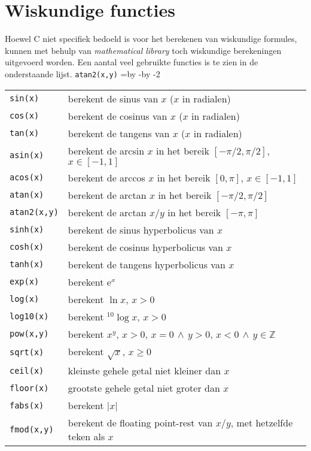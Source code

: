\section{Wiskundige functies}
Hoewel C niet specifiek bedoeld is voor het berekenen van wiskundige formules, kunnen met behulp van \textsl{mathematical library} toch wiskundige berekeningen uitgevoerd worden. Een aantal veel gebruikte functies is te zien in de onderstaande lijst.
\hbox{\texttt{atan2(x,y)}}
\newdimen\delengteb\delengteb=\textwidth\advance\delengteb by -\advance\delengteb by -2\tabcolsep
\begin{table}[!ht]
\centering
\begin{tabular}{lp{\delengteb}}
\texttt{sin(x)} & berekent de sinus van $x$ ($x$ in radialen)\\
\texttt{cos(x)} & berekent de cosinus van $x$ ($x$ in radialen)\\
\texttt{tan(x)} & berekent de tangens van $x$ ($x$ in radialen)\\
\texttt{asin(x)} & berekent de arcsin $x$ in het bereik $[-\pi/2, \pi/2]$,  $x\in [-1,1]$\\
\texttt{acos(x)} & berekent de arccos $x$ in het bereik $[0, \pi]$,  $x\in [-1,1]$\\
\texttt{atan(x)} & berekent de arctan $x$ in het bereik $[-\pi/2, \pi/2]$\\
\texttt{atan2(x,y)} & berekent de arctan $x/y$ in het bereik $[-\pi, \pi]$\\
\texttt{sinh(x)} & berekent de sinus hyperbolicus van $x$\\
\texttt{cosh(x)} & berekent de cosinus hyperbolicus van $x$\\
\texttt{tanh(x)} & berekent de tangens hyperbolicus van $x$\\
\texttt{exp(x)} & berekent $\mathrm{e}^x$\\
\texttt{log(x)} & berekent $\ln x$, $x>0$\\
\texttt{log10(x)} & berekent $^{10}\!\log x$, $x>0$\\
\texttt{pow(x,y)} & berekent $x^y$, $x>0,\,x=0\,\wedge\,y>0,\,x<0\,\wedge\,y\in\mathbb{Z}$\\
\texttt{sqrt(x)} & berekent $\sqrt{x}$, $x\geq0$\\
\texttt{ceil(x)} & kleinste gehele getal niet kleiner dan $x$\\
\texttt{floor(x)} & grootste gehele getal niet groter dan $x$\\
\texttt{fabs(x)} & berekent $|x|$\\
\texttt{fmod(x,y)} & berekent de floating point-rest van $x/y$, met hetzelfde teken als $x$\\
\end{tabular}
\end{table}

